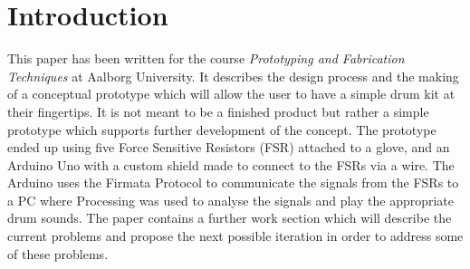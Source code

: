 \section*{Introduction}
\label{Introduktion}
This paper has been written for the course \textit{Prototyping and Fabrication Techniques} at Aalborg University. It describes the design process and the making of a conceptual prototype which will allow the user to have a simple drum kit at their fingertips. It is not meant to be a finished product but rather a simple prototype which supports further development of the concept. 
The prototype ended up using five Force Sensitive Resistors (FSR) attached to a glove, and an Arduino Uno with a custom shield made to connect to the FSRs via a wire. The Arduino uses the Firmata Protocol to communicate the signals from the FSRs to a PC where Processing was used to analyse the signals and play the appropriate drum sounds. The paper contains a further work section which will describe the current problems and propose the next possible iteration in order to address some of these problems.